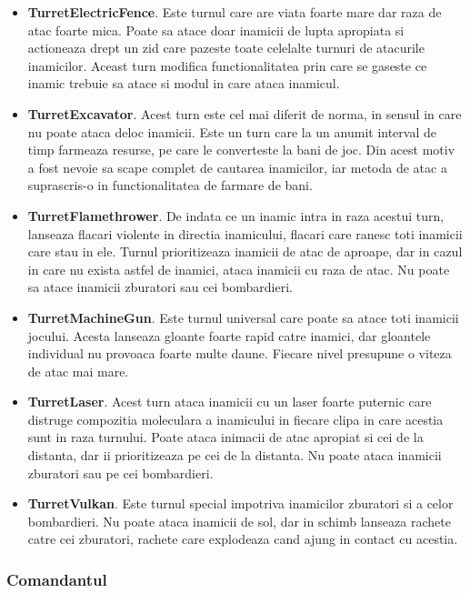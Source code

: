 \documentclass[12pt, a4paper]{article}
\begin{document}
	\begin{itemize}
		\item \textbf{TurretElectricFence}. Este turnul care are viata foarte mare dar raza de atac foarte mica. Poate sa atace doar inamicii de lupta apropiata si actioneaza drept un zid care pazeste toate celelalte turnuri de atacurile inamicilor. Aceast turn modifica functionalitatea prin care se gaseste ce inamic trebuie sa atace si modul in care ataca inamicul.
		\item \textbf{TurretExcavator}. Acest turn este cel mai diferit de norma, in sensul in care nu poate ataca deloc inamicii. Este un turn care la un anumit interval de timp farmeaza resurse, pe care le converteste la bani de joc. Din acest motiv a fost nevoie sa scape complet de cautarea inamicilor, iar metoda de atac a suprascris-o in functionalitatea de farmare de bani.
		\item \textbf{TurretFlamethrower}. De indata ce un inamic intra in raza acestui turn, lanseaza flacari violente in directia inamicului, flacari care ranesc toti inamicii care stau in ele. Turnul prioritizeaza inamicii de atac de aproape, dar in cazul in care nu exista astfel de inamici, ataca inamicii cu raza de atac. Nu poate sa atace inamicii zburatori sau cei bombardieri.
		\item \textbf{TurretMachineGun}. Este turnul universal care poate sa atace toti inamicii jocului. Acesta lanseaza gloante foarte rapid catre inamici, dar gloantele individual nu provoaca foarte multe daune. Fiecare nivel presupune o viteza de atac mai mare.
		\item \textbf{TurretLaser}. Acest turn ataca inamicii cu un laser foarte puternic care distruge compozitia moleculara a inamicului in fiecare clipa in care acestia sunt in raza turnului. Poate ataca inimacii de atac apropiat si cei de la distanta, dar ii prioritizeaza pe cei de la distanta. Nu poate ataca inamicii zburatori sau pe cei bombardieri.
		\item \textbf{TurretVulkan}. Este turnul special impotriva inamicilor zburatori si a celor bombardieri. Nu poate ataca inamicii de sol, dar in schimb lanseaza rachete catre cei zburatori, rachete care explodeaza cand ajung in contact cu acestia.
	\end{itemize}
	
	
	
	
	
	\subsubsection{Comandantul}
	\label{section: commander}
	
\end{document}
